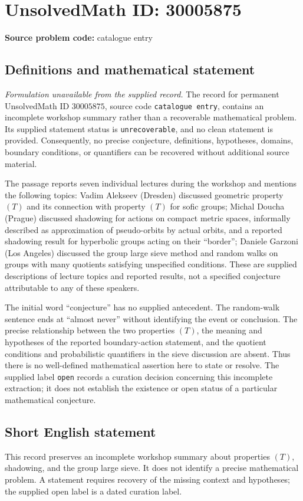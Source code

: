 \documentclass[11pt]{article}
\begin{document}
\section*{UnsolvedMath ID: 30005875}
\textbf{Source problem code:} catalogue entry
\subsection{Definitions and mathematical statement}
\emph{Formulation unavailable from the supplied record.} The record for permanent UnsolvedMath ID \(30005875\), source code \texttt{catalogue entry}, contains an incomplete workshop summary rather than a recoverable mathematical problem. Its supplied statement status is \texttt{unrecoverable}, and no clean statement is provided. Consequently, no precise conjecture, definitions, hypotheses, domains, boundary conditions, or quantifiers can be recovered without additional source material.

The passage reports seven individual lectures during the workshop and mentions the following topics: Vadim Alekseev (Dresden) discussed geometric property \((T)\) and its connection with property \((T)\) for sofic groups; Michal Doucha (Prague) discussed shadowing for actions on compact metric spaces, informally described as approximation of pseudo-orbits by actual orbits, and a reported shadowing result for hyperbolic groups acting on their ``border''; Daniele Garzoni (Los Angeles) discussed the group large sieve method and random walks on groups with many quotients satisfying unspecified conditions. These are supplied descriptions of lecture topics and reported results, not a specified conjecture attributable to any of these speakers.

The initial word ``conjecture'' has no supplied antecedent. The random-walk sentence ends at ``almost never'' without identifying the event or conclusion. The precise relationship between the two properties \((T)\), the meaning and hypotheses of the reported boundary-action statement, and the quotient conditions and probabilistic quantifiers in the sieve discussion are absent. Thus there is no well-defined mathematical assertion here to state or resolve. The supplied label \texttt{open} records a curation decision concerning this incomplete extraction; it does not establish the existence or open status of a particular mathematical conjecture.
\subsection{Short English statement}
This record preserves an incomplete workshop summary about properties \((T)\), shadowing, and the group large sieve. It does not identify a precise mathematical problem. A statement requires recovery of the missing context and hypotheses; the supplied open label is a dated curation label.
\end{document}
